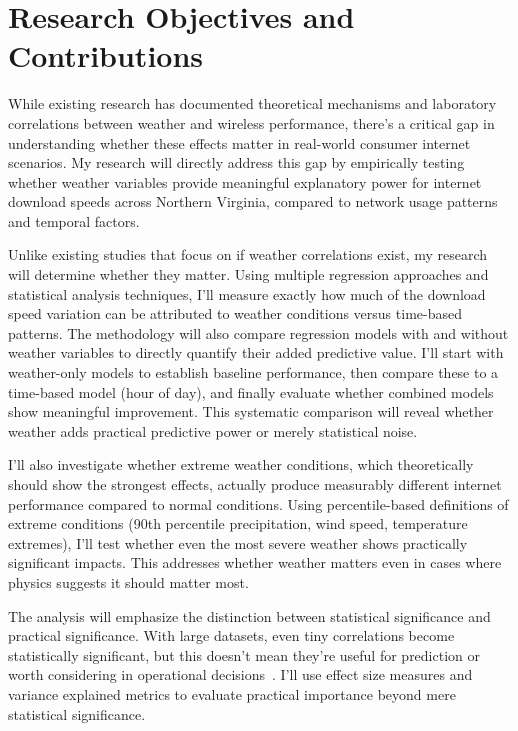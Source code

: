 \documentclass[11pt]{report}
\begin{document}
\section{Research Objectives and Contributions}

While existing research has documented theoretical mechanisms and laboratory correlations between weather and wireless performance, there's a critical gap in understanding whether these effects matter in real-world consumer internet scenarios. My research will directly address this gap by empirically testing whether weather variables provide meaningful explanatory power for internet download speeds across Northern Virginia, compared to network usage patterns and temporal factors.

Unlike existing studies that focus on if weather correlations exist, my research will determine whether they matter. Using multiple regression approaches and statistical analysis techniques, I'll measure exactly how much of the download speed variation can be attributed to weather conditions versus time-based patterns. The methodology will also compare regression models with and without weather variables to directly quantify their added predictive value. I'll start with weather-only models to establish baseline performance, then compare these to a time-based model (hour of day), and finally evaluate whether combined models show meaningful improvement. This systematic comparison will reveal whether weather adds practical predictive power or merely statistical noise.

I'll also investigate whether extreme weather conditions, which theoretically should show the strongest effects, actually produce measurably different internet performance compared to normal conditions. Using percentile-based definitions of extreme conditions (90th percentile precipitation, wind speed, temperature extremes), I'll test whether even the most severe weather shows practically significant impacts. This addresses whether weather matters even in cases where physics suggests it should matter most.

The analysis will emphasize the distinction between statistical significance and practical significance. With large datasets, even tiny correlations become statistically significant, but this doesn't mean they're useful for prediction or worth considering in operational decisions~\cite{sullivan2012effect}. I'll use effect size measures and variance explained metrics to evaluate practical importance beyond mere statistical significance.
\end{document}
